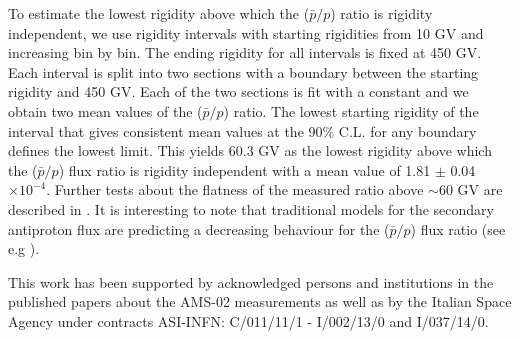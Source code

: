\documentclass[twocolumn,twoside,slac_two]{revtex4-1}
\begin{document}
To estimate the lowest rigidity above which the ($\bar{p}/p$)
ratio is rigidity independent, we use rigidity intervals
with starting rigidities from 10 GV and increasing bin by
bin. The ending rigidity for all intervals is fixed at 450 GV.
Each interval is split into two sections with a boundary
between the starting rigidity and 450 GV. Each of the two
sections is fit with a constant and we obtain two mean
values of the ($\bar{p}/p$) ratio. The lowest starting rigidity of
the interval that gives consistent mean values at the
90$\%$ C.L. for any boundary defines the lowest limit.
This yields 60.3 GV as the lowest rigidity above which
the ($\bar{p}/p$) flux ratio is rigidity independent with a mean
value of 1.81 $\pm$ 0.04 $\times 10^{-4}$.
Further tests about the flatness of the measured ratio above $\sim 60$ GV
are described in \cite{ref:AMS2_pbar}.
It is interesting to note that traditional models 
for the secondary antiproton flux
are predicting a decreasing behaviour for the ($\bar{p}/p$) flux ratio
(see e.g \cite{ref:donato}).

\begin{acknowledgments}
  This work has been supported by acknowledged persons and institutions in the published papers about the AMS-02
  measurements \cite{ref:AMS2_first,ref:AMS2_fraction,ref:AMS2_epfluxes,ref:AMS2_allele,ref:AMS2_protons,ref:AMS2_He,ref:AMS2_pbar,ref:AMS2_BC}
  as well as by the Italian Space Agency under contracts ASI-INFN: C/011/11/1 - I/002/13/0 and I/037/14/0.
\end{acknowledgments}
\end{document}
